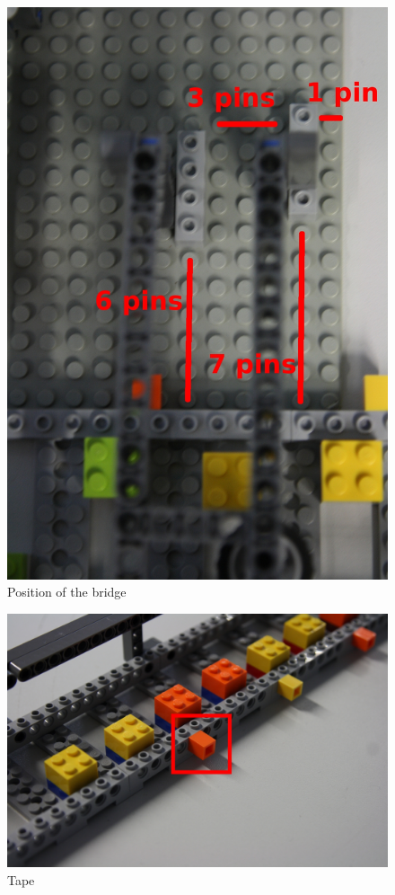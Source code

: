 \documentclass[%
  a4paper,%
  11pt,%
  blue,%
  hyperref	%
  ]{tubsartcl}
\begin{document}
\begin{figure}[!htb]
\begin{center}
\includegraphics[scale=0.4]{graphics/bridge2.jpg}
\end{center}
\caption{Position of the bridge}
\end{figure}

\begin{figure}[!htb]
\begin{center}
\includegraphics[scale=0.3]{graphics/tape.jpg}
\end{center}
\caption{Tape}
\end{figure}
\end{document}
